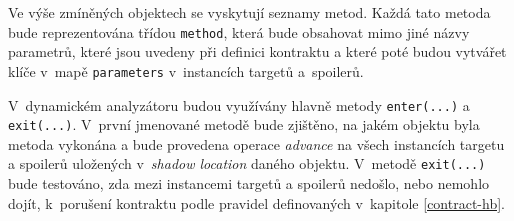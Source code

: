Ve výše zmíněných objektech se vyskytují seznamy metod. Každá tato metoda bude reprezentována třídou \texttt{method}, která bude obsahovat mimo jiné názvy parametrů, které jsou uvedeny při definici kontraktu a které poté budou vytvářet klíče v~mapě \texttt{parameters} v~instancích targetů a~spoilerů.

V~dynamickém analyzátoru budou využívány hlavně metody \texttt{enter(...)} a \texttt{exit(...)}. V~první jmenované metodě bude zjištěno, na jakém objektu byla metoda vykonána a bude provedena operace \textit{advance} na všech instancích targetu a spoilerů uložených v~\textit{shadow location} daného objektu. V~metodě \texttt{exit(...)} bude testováno, zda mezi instancemi targetů a spoilerů nedošlo, nebo nemohlo dojít, k~porušení kontraktu podle pravidel definovaných v~kapitole \ref{contract-hb}.






